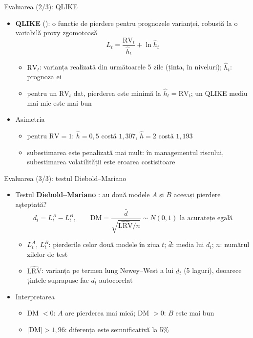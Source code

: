 \begin{frame}{Evaluarea (2/3): QLIKE}
\itemsize{\small}
\begin{itemize}
    \item \textbf{QLIKE} (): o funcție de pierdere pentru prognozele varianței, robustă la o variabilă proxy zgomotoasă  \[ L_t = \frac{\mathrm{RV}_t}{\hat h_t} + \ln\hat h_t \]
    \begin{itemize}
        \item $\mathrm{RV}_t$: varianța realizată din următoarele 5 zile (ținta, în niveluri); $\hat h_t$: prognoza ei
        \item pentru un $\mathrm{RV}_t$ dat, pierderea este minimă la $\hat h_t = \mathrm{RV}_t$; un QLIKE mediu mai mic este mai bun
    \end{itemize}
    \item Asimetria
    \begin{itemize}
        \item pentru $\mathrm{RV} = 1$: $\hat h = 0{,}5$ costă $1{,}307$, $\hat h = 2$ costă $1{,}193$
        \item subestimarea este penalizată mai mult: în managementul riscului, subestimarea volatilității este eroarea costisitoare
    \end{itemize}
\end{itemize}
\end{frame}

\begin{frame}{Evaluarea (3/3): testul Diebold--Mariano}
\itemsize{\small}
\begin{itemize}
    \item Testul \textbf{Diebold--Mariano} : au două modele $A$ și $B$ aceeași pierdere așteptată? \[ d_t = L_t^{A} - L_t^{B}, \qquad \mathrm{DM} = \frac{\bar d}{\sqrt{\widehat{\mathrm{LRV}}/n}} \sim N(0,1) \text{ la acuratețe egală} \]
    \begin{itemize}
        \item $L_t^{A}$, $L_t^{B}$: pierderile celor două modele în ziua $t$; $\bar d$: media lui $d_t$; $n$: numărul zilelor de test
        \item $\widehat{\mathrm{LRV}}$: varianța pe termen lung Newey--West a lui $d_t$ (5 laguri), deoarece țintele suprapuse fac $d_t$ autocorelat
    \end{itemize}
    \item Interpretarea
    \begin{itemize}
        \item DM $< 0$: $A$ are pierderea mai mică; DM $> 0$: $B$ este mai bun
        \item $|\mathrm{DM}| > 1{,}96$: diferența este semnificativă la 5\%
    \end{itemize}
\end{itemize}
\end{frame}

